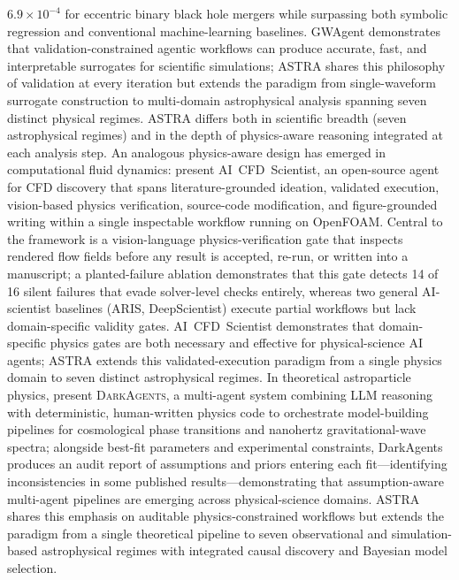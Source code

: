 \documentclass[usenatbib]{rasti}
\begin{document}
$6.9\times10^{-4}$ for eccentric binary black hole mergers while surpassing both symbolic regression and conventional machine-learning baselines. GWAgent demonstrates that validation-constrained agentic workflows can produce accurate, fast, and interpretable surrogates for scientific simulations; ASTRA shares this philosophy of validation at every iteration but extends the paradigm from single-waveform surrogate construction to multi-domain astrophysical analysis spanning seven distinct physical regimes. ASTRA differs both in scientific breadth (seven astrophysical regimes) and in the depth of physics-aware reasoning integrated at each analysis step. An analogous physics-aware design has emerged in computational fluid dynamics: \citet{somasekharan2026cfdscientist} present AI~CFD~Scientist, an open-source agent for CFD discovery that spans literature-grounded ideation, validated execution, vision-based physics verification, source-code modification, and figure-grounded writing within a single inspectable workflow running on OpenFOAM. Central to the framework is a vision-language physics-verification gate that inspects rendered flow fields before any result is accepted, re-run, or written into a manuscript; a planted-failure ablation demonstrates that this gate detects 14 of 16 silent failures that evade solver-level checks entirely, whereas two general AI-scientist baselines (ARIS, DeepScientist) execute partial workflows but lack domain-specific validity gates. AI~CFD~Scientist demonstrates that domain-specific physics gates are both necessary and effective for physical-science AI agents; ASTRA extends this validated-execution paradigm from a single physics domain to seven distinct astrophysical regimes. In theoretical astroparticle physics, \citet{lucente2026darkagents} present \textsc{DarkAgents}, a multi-agent system combining LLM reasoning with deterministic, human-written physics code to orchestrate model-building pipelines for cosmological phase transitions and nanohertz gravitational-wave spectra; alongside best-fit parameters and experimental constraints, DarkAgents produces an audit report of assumptions and priors entering each fit---identifying inconsistencies in some published results---demonstrating that assumption-aware multi-agent pipelines are emerging across physical-science domains. ASTRA shares this emphasis on auditable physics-constrained workflows but extends the paradigm from a single theoretical pipeline to seven observational and simulation-based astrophysical regimes with integrated causal discovery and Bayesian model selection.
\end{document}
